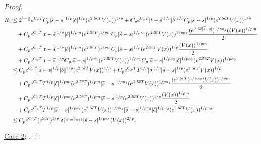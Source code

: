 \documentclass[11pt]{article}
\theoremstyle{theorem}
\theoremstyle{definition}
\newcommand{\1}{{\bf 1}}
\begin{document}
\begin{proof}
  \begin{align}
  \label{vi3}
R_1
 & \le 2^{1-\frac{1}{p}} e^{C_p T}  C_p |\widetilde{s}-s|^{1/p} |\delta|^{1/p} (e^{2.5\overline{c}T}V(x))^{1/p}  + C_p e^{C_p T} |t-\widetilde{s}|^{1/p}  |\delta|^{1/p} C_p|\widetilde{s} -s|^{1/p} (e^{2.5\overline{c}T}V(x))^{1/p}   \notag\\
& \quad  +C_p e^{C_p T} |t-\widetilde{s}|^{1/p} |\delta|^{1/pm} (e^{2.5\overline{c}T})^{1/pm} C_p |\widetilde{s} -s|^{1/p\kappa_1} (e^{2.5\overline{c}T}V(x))^{1/p\kappa_1}  \dfrac{(e^{2.5\overline{c} |\widetilde{s}-s|})^{1/p\kappa_2}((V(x))^{1/pm}}{2} \notag\\
& \quad  +C_p e^{C_p T} |t-\widetilde{s}|^{1/p} |\delta|^{1/pm} (e^{2.5\overline{c}T})^{1/pm} C_p |\widetilde{s} -s|^{1/p} (e^{2.5\overline{c}T}V(x))^{1/p}   \dfrac{(V(x))^{1/pm}}{2} \notag\\
& \quad  +C_p e^{C_p T} |t-\widetilde{s}|^{1/p}  C_p |\widetilde{s} -s|^{1/p\kappa_1} (e^{2.5\overline{c}T}V(x))^{1/p\kappa_1}  C_p |\widetilde{s} -s|^{1/p\kappa_2} |\delta|^{1/p \kappa_2} (e^{2.5\overline{c}T}V(x))^{1/p\kappa_2}  \notag\\
&\leq C_p e^{C_p T}   |\widetilde{s}-s|^{1/p} |\delta|^{1/p} (e^{2.5\overline{c}T}V(x))^{1/p}  + C_p e^{C_p T} T^{1/p}  |\delta|^{1/p} |\widetilde{s} -s|^{1/p} (e^{2.5\overline{c}T}V(x))^{1/p}   \notag\\
& \quad  + C_p e^{C_p T} T^{1/p} |\delta|^{1/pm} (e^{2.5\overline{c}T})^{1/pm}  |\widetilde{s} -s|^{1/p\kappa_1} (e^{2.5\overline{c}T}V(x))^{1/p\kappa_1} \dfrac{(e^{2.5\overline{c}T})^{1/p\kappa_2}(V(x))^{1/pm}}{2} \notag\\
& \quad  + C_p e^{C_p T} T^{1/p} |\delta|^{1/pm} (e^{2.5\overline{c}T})^{1/pm}  |\widetilde{s} -s|^{1/p} (e^{2.5\overline{c}T}V(x))^{1/p}  \dfrac{(V(x))^{1/pm}}{2} \notag\\
& \quad  +C_p e^{C_p T} T^{1/p}  |\widetilde{s} -s|^{1/p\kappa_1} (e^{2.5\overline{c}T}V(x))^{1/p\kappa_1}   |\widetilde{s} -s|^{1/p\kappa_2} |\delta|^{1/p \kappa_2} (e^{2.5\overline{c}T}V(x))^{1/p\kappa_2}  \notag\\
  & \leq  C_p e^{C_p T}  (e^{5\overline{c}T})^{1/p } |\delta|^{\frac{1}{p(m \vee \kappa_2)}}  |\widetilde{s}-s|^{1/p\kappa_1}(V(x))^{2/p}.
 \end{align}

\noindent\underline{Case 2}: .


\end{proof}
\end{document}
